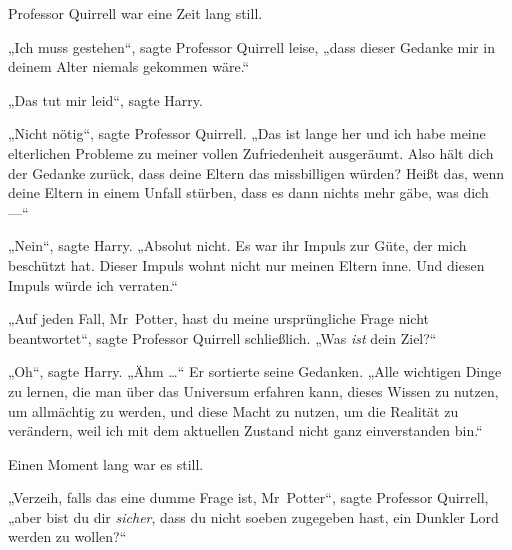 Professor Quirrell war eine Zeit lang still.

„Ich muss gestehen“, sagte Professor Quirrell leise, „dass dieser Gedanke mir in deinem Alter niemals gekommen wäre.“

„Das tut mir leid“, sagte Harry.

„Nicht nötig“, sagte Professor Quirrell.
„Das ist lange her und ich habe meine elterlichen Probleme zu meiner vollen Zufriedenheit ausgeräumt. Also hält dich der Gedanke zurück, dass deine Eltern das missbilligen würden? Heißt das, wenn deine Eltern in einem Unfall stürben, dass es dann nichts mehr gäbe, was dich —“

„Nein“, sagte Harry.
„Absolut nicht. Es war ihr Impuls zur Güte, der mich beschützt hat. Dieser Impuls wohnt nicht nur meinen Eltern inne. Und diesen Impuls würde ich verraten.“

„Auf jeden Fall, Mr~Potter, hast du meine ursprüngliche Frage nicht beantwortet“, sagte Professor Quirrell schließlich.
„Was \emph{ist} dein Ziel?“

„Oh“, sagte Harry. „Ähm …“ Er sortierte seine Gedanken.
„Alle wichtigen Dinge zu lernen, die man über das Universum erfahren kann, dieses Wissen zu nutzen, um allmächtig zu werden, und diese Macht zu nutzen, um die Realität zu verändern, weil ich mit dem aktuellen Zustand nicht ganz einverstanden bin.“

Einen Moment lang war es still.

„Verzeih, falls das eine dumme Frage ist, Mr~Potter“, sagte Professor Quirrell, „aber bist du dir \emph{sicher}, dass du nicht soeben zugegeben hast, ein Dunkler Lord werden zu wollen?“

